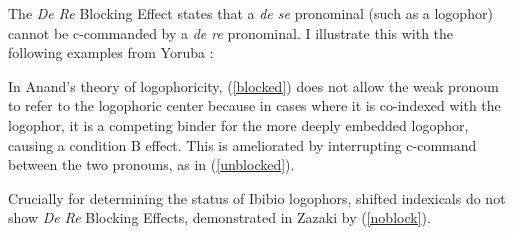 \documentclass[output=paper]{langscibook}
\begin{document}
The \textit{De Re} Blocking Effect \citep{Anand2006} states that a \textit{de se} pronominal (such as a logophor) cannot be c-commanded by a \textit{de re} pronominal. I illustrate this with the following examples from Yoruba \citep{Adesola2005}:
\begin{exe}
    \ex {}
    \begin{xlist}
	\label{control}
	\label{blocked}
	\label{unblocked}
	\end{xlist}
\end{exe}
In Anand's theory of logophoricity, (\ref{blocked}) does not allow the weak pronoun to refer to the logophoric center because in cases where it is co-indexed with the logophor, it is a competing binder for the more deeply embedded logophor, causing a condition B effect. This is ameliorated by interrupting c-command between the two pronouns, as in (\ref{unblocked}).

Crucially for determining the status of Ibibio logophors, shifted indexicals do not show \textit{De Re} Blocking Effects, demonstrated in Zazaki by (\ref{noblock}).
\end{document}
